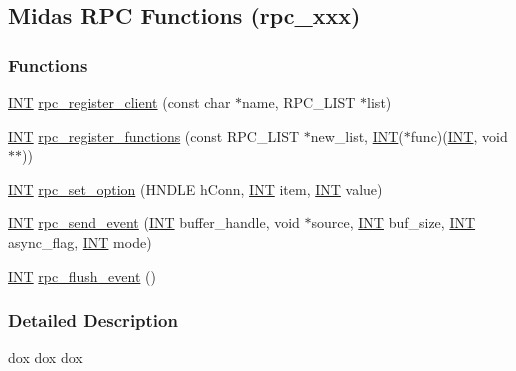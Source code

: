 \subsection{Midas RPC Functions (rpc\_\-xxx)}
\label{group__rpcfunctionc}
\subsubsection*{Functions}
\begin{DoxyCompactItemize}
\item 
\hyperlink{vppg_8h_a392e62da233ed3e2f7c3fd4f487a3896}{INT} \hyperlink{group__rpcfunctionc_ga86593a38d88520b4cef9644b7fdc6d23}{rpc\_\-register\_\-client} (const char $\ast$name, RPC\_\-LIST $\ast$list)
\item 
\hyperlink{vppg_8h_a392e62da233ed3e2f7c3fd4f487a3896}{INT} \hyperlink{group__rpcfunctionc_ga8503759d27477f8dd4558864dde5a687}{rpc\_\-register\_\-functions} (const RPC\_\-LIST $\ast$new\_\-list, \hyperlink{vppg_8h_a392e62da233ed3e2f7c3fd4f487a3896}{INT}($\ast$func)(\hyperlink{vppg_8h_a392e62da233ed3e2f7c3fd4f487a3896}{INT}, void $\ast$$\ast$))
\item 
\hyperlink{vppg_8h_a392e62da233ed3e2f7c3fd4f487a3896}{INT} \hyperlink{group__rpcfunctionc_gaab360e4fd185439b0913c723581115ea}{rpc\_\-set\_\-option} (HNDLE hConn, \hyperlink{vppg_8h_a392e62da233ed3e2f7c3fd4f487a3896}{INT} item, \hyperlink{vppg_8h_a392e62da233ed3e2f7c3fd4f487a3896}{INT} value)
\item 
\hyperlink{vppg_8h_a392e62da233ed3e2f7c3fd4f487a3896}{INT} \hyperlink{group__rpcfunctionc_ga3191feb350dfa7289e8c7cf2f5993222}{rpc\_\-send\_\-event} (\hyperlink{vppg_8h_a392e62da233ed3e2f7c3fd4f487a3896}{INT} buffer\_\-handle, void $\ast$source, \hyperlink{vppg_8h_a392e62da233ed3e2f7c3fd4f487a3896}{INT} buf\_\-size, \hyperlink{vppg_8h_a392e62da233ed3e2f7c3fd4f487a3896}{INT} async\_\-flag, \hyperlink{vppg_8h_a392e62da233ed3e2f7c3fd4f487a3896}{INT} mode)
\item 
\hyperlink{vppg_8h_a392e62da233ed3e2f7c3fd4f487a3896}{INT} \hyperlink{group__rpcfunctionc_ga83d80e4f1e8d2a2d7f38e58dcfd3c711}{rpc\_\-flush\_\-event} ()
\end{DoxyCompactItemize}


\subsubsection{Detailed Description}
dox dox dox 

